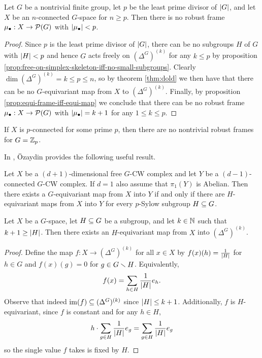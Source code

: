 \begin{theorem}\label{thm:frame-card-geq-min-prime-divisor}
    Let $G$ be a nontrivial finite group, let $p$ be the least prime divisor of $\left| G \right|$, and let $X$ be an $n$-connected $G$-space for $n \geq p$.
    Then there is no robust frame $\mu_\bullet : X \to \mathcal{P}(G)$ with $\left| \mu_\bullet \right| < p$.
    \begin{proof}
        Since $p$ is the least prime divisor of $\left| G \right|$, there can be no subgroups $H$ of $G$ with $\left| H \right| < p$ and hence $G$ acts freely on $(\Delta^G)^{(k)}$ for any $k \leq p$ by proposition \ref{prop:free-on-simplex-skeleton-iff-no-small-subgroups}.
        Clearly $\dim (\Delta^G)^{(k)} = k \leq p \leq n$, so by theorem \ref{thm:dold} we then have that there can be no $G$-equivariant map from $X$ to $(\Delta^G)^{(k)}$.
        Finally, by proposition \ref{prop:equi-frame-iff-equi-map} we conclude that there can be no robust frame $\mu_\bullet : X \to \mathcal{P}(G)$ with $\left| \mu_\bullet \right| = k+1$ for any $1 \leq k \leq p$.
    \end{proof}
\end{theorem}

\begin{corollary}
    If $X$ is $p$-connected for some prime $p$, then there are no nontrivial robust frames for $G = \mathbb{Z}_p$.
\end{corollary}

In \cite{ozaydin1987equivariantmaps}, \"Ozaydin provides the following useful result.


\begin{theorem}\label{thm:Ozaydin}
    Let $X$ be a $(d+1)$-dimensional free $G$-CW complex and let $Y$ be a $(d-1)$-connected $G$-CW complex.
    If $d = 1$ also assume that $\pi_1(Y)$ is Abelian.
    Then there exists a $G$-equivariant map from $X$ into $Y$ if and only if there are $H$-equivariant maps from $X$ into $Y$ for every $p$-Sylow subgroup $H \subseteq G$.
\end{theorem}


\begin{lemma}\label{lem:subgroup-equi-skeleton-map}
    Let $X$ be a $G$-space, let $H \subseteq G$ be a subgroup, and let $k \in \mathbb{N}$ such that $k + 1 \geq \left| H \right|$.
    Then there exists an $H$-equivariant map from $X$ into $(\Delta^G)^{(k)}$.
    \begin{proof}
        Define the map $f : X \to (\Delta^G)^{(k)}$ for all $x \in X$ by $f(x)(h) = \frac{1}{\left| H \right|}$ for $h \in G$ and $f(x)(g) = 0$ for $g \in G \smallsetminus H$.
        Equivalently,
        \[
            f(x) = \sum_{h \in H} \frac{1}{\left| H \right|} e_h.
        \]
        Observe that indeed $\operatorname{im}(f) \subseteq (\Delta^G)^{(k)}$ since $\left| H \right| \leq k + 1$.
        Additionally, $f$ is $H$-equivariant, since $f$ is constant and for any $h \in H$,
        \[
            h \cdot \sum_{g \in H} \frac{1}{\left| H \right|} e_g
            = \sum_{g \in H} \frac{1}{\left| H \right|} e_g
        \]
        so the single value $f$ takes is fixed by $H$.
    \end{proof}
\end{lemma}


